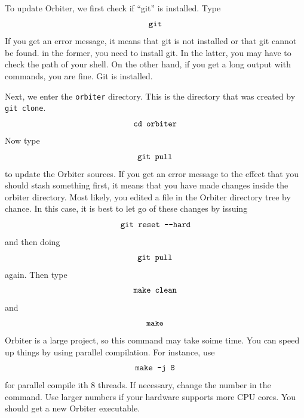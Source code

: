 To update Orbiter, 
we first check if ``git'' is installed. Type
$$
\verb'git'
$$
If you get an error message, it means that git 
is not installed or that git cannot be found. 
in the former, you need to install git. 
In the latter, you may have to check the path of your shell. 
On the other hand, if you get a long output with commands, 
you are fine. 
Git is installed. 

\bigskip

Next, we enter the \verb'orbiter' directory. 
This is the directory that was created by \verb'git clone'.
$$
\verb'cd orbiter'
$$
Now type 
$$
\verb'git pull'
$$
to update the Orbiter sources. 
If you get an error message 
to the effect that you should stash something first, 
it means that you have made 
changes inside the orbiter directory. 
Most likely, you edited a file in the 
Orbiter directory tree by chance. 
In this case, it is best to let go of these changes by issuing
$$
\verb'git reset --hard'
$$
and then doing 
$$
\verb'git pull'
$$
again.
Then type 
$$
\verb'make clean'
$$
and
$$
\verb'make'
$$
Orbiter is a large project, 
so this command may take soime time. 
You can speed up things by using parallel compilation. 
For instance, use
$$
\verb'make -j 8'
$$
for parallel compile ith 8 threads. 
If necessary, 
change the number in the command.
Use larger numbers if your hardware supports more CPU cores. 
You should get a new Orbiter executable. 

